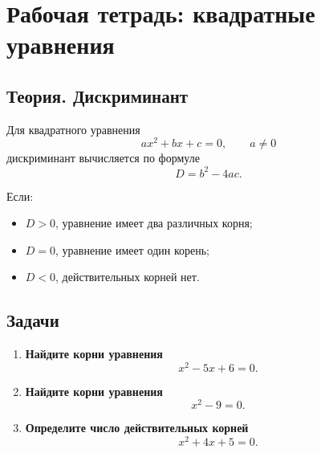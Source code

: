 \documentclass[12pt,a4paper]{article}
\begin{document}
\section*{Рабочая тетрадь: квадратные уравнения}

\subsection*{Теория. Дискриминант}
Для квадратного уравнения
\[
ax^2 + bx + c = 0, \qquad a \neq 0
\]
дискриминант вычисляется по формуле
\[
D = b^2 - 4ac.
\]

Если:
\begin{itemize}
\item $D > 0$, уравнение имеет два различных корня;
\item $D = 0$, уравнение имеет один корень;
\item $D < 0$, действительных корней нет.
\end{itemize}

\subsection*{Задачи}
\begin{enumerate}
\item \textbf{Найдите корни уравнения}
\[
x^2 - 5x + 6 = 0.
\]

\vspace{6mm}

\item \textbf{Найдите корни уравнения}
\[
x^2 - 9 = 0.
\]

\vspace{6mm}

\item \textbf{Определите число действительных корней}
\[
x^2 + 4x + 5 = 0.
\]
\end{enumerate}
\end{document}
